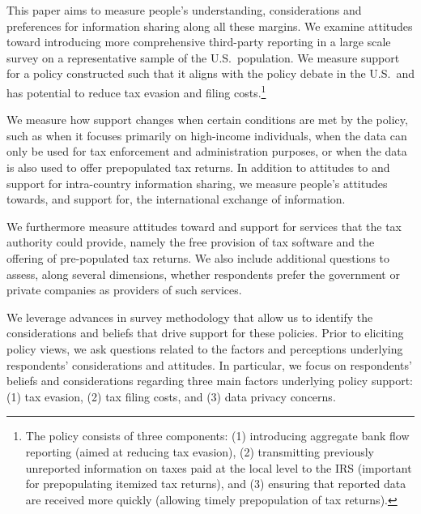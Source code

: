 \documentclass[12pt]{article}
\begin{document}
This paper aims to measure people's understanding, considerations and preferences for information sharing along all these margins. We examine attitudes toward introducing more comprehensive third-party reporting in a large scale survey on a representative sample of the U.S.\ population. We measure support for a policy constructed such that it aligns with the policy debate in the U.S.\ and has potential to reduce tax evasion and filing costs.\footnote{The policy consists of three components: (1) introducing aggregate bank flow reporting (aimed at reducing tax evasion), (2) transmitting previously unreported information on taxes paid at the local level to the IRS (important for prepopulating itemized tax returns), and (3) ensuring that reported data are received more quickly (allowing timely prepopulation of tax returns).} 

We measure how support changes when certain conditions are met by the policy, such as when it focuses primarily on high-income individuals, when the data can only be used for tax enforcement and administration purposes, or when the data is also used to offer prepopulated tax returns. In addition to attitudes to and support for intra-country information sharing, we measure people's attitudes towards, and support for, the international exchange of information.

We furthermore measure attitudes toward and support for services that the tax authority could provide, namely the free provision of tax software and the offering of pre-populated tax returns. We also include additional questions to assess, along several dimensions, whether respondents prefer the government or private companies as providers of such services.

We leverage advances in survey methodology that allow us to identify the considerations and beliefs that drive support for these policies. Prior to eliciting policy views, we ask questions related to the factors and perceptions underlying respondents’ considerations and attitudes. In particular, we focus on respondents’ beliefs and considerations regarding three main factors underlying policy support: (1) tax evasion, (2) tax filing costs, and (3) data privacy concerns.
\end{document}
